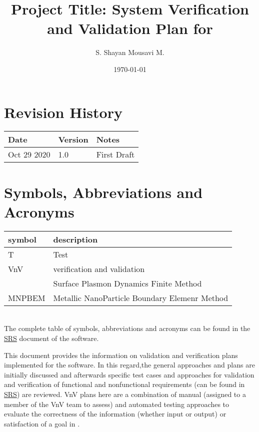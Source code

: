 \documentclass[12pt, titlepage]{article}
\begin{document}
\title{Project Title: System Verification and Validation Plan for \progname{}} 
\author{S. Shayan Mousavi M.}
\date{\today}
	
\maketitle


\section{Revision History}

\begin{tabularx}{\textwidth}{p{3cm}p{2cm}X}
\toprule {\bf Date} & {\bf Version} & {\bf Notes}\\
\midrule
Oct 29 2020& 1.0 & First Draft\\
\bottomrule
\end{tabularx}

\newpage

\tableofcontents

\listoftables

\listoffigures

\newpage

\section{Symbols, Abbreviations and Acronyms}

\renewcommand{\arraystretch}{1.2}
\begin{tabular}{l l} 
  \toprule		
  \textbf{symbol} & \textbf{description}\\
  \midrule 
  T & Test\\
  VnV & verification and validation\\
  \progname{} & Surface Plasmon Dynamics Finite Method\\
  MNPBEM & Metallic NanoParticle Boundary Elemenr Method\\
  \bottomrule
\end{tabular}\\
The complete table of symbols, abbreviations and acronyms can be found in the \href{https://github.com/shmouses/SPDFM/tree/master/docs/SRS}{SRS} document of the software. 
\newpage


This document provides the information on validation and verification plans implemented for the \progname{} software. In this regard,the general approaches and plans are initially discussed and afterwards specific test cases and approaches for validation and verification of functional and nonfunctional requirements (can be found in \href{https://github.com/shmouses/SPDFM/tree/master/docs/SRS}{SRS}) are reviewed. VnV plans here are a combination of manual (assigned to a member of the VnV team to assess) and automated testing approaches to evaluate the correctness of the information (whether input or output) or satisfaction of a goal in \progname{}.    
\end{document}

